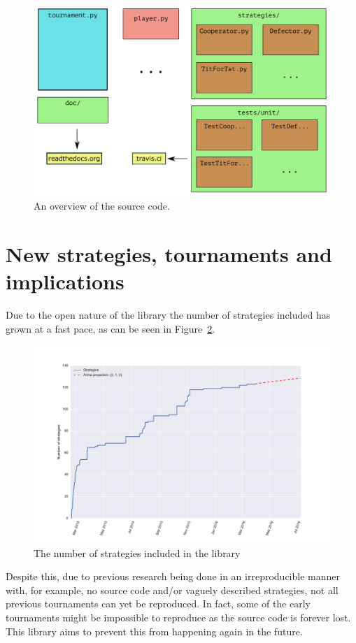 \documentclass{jors}
\begin{document}
\begin{figure}[!hbtp]
	\centering
	\includegraphics[width=.9\textwidth]{outline_of_library.pdf}
	\caption{An overview of the source code.}
	\label{fig:overview}
\end{figure}

\section*{New strategies, tournaments and implications}\label{sec:new-strategies-and-implications}

Due to the open nature of the library the number of strategies included has
grown at a fast pace, as can be seen in
Figure~\ref{fig:number_of_strategies_against_date}.

\begin{figure}[!hbtp]
	\centering
	\includegraphics[width=.75\textwidth]{number_of_strategies_with_arima_projection.pdf}
	\caption{The number of strategies included in the library}
	\label{fig:number_of_strategies_against_date}
\end{figure}

Despite this, due to previous research being done in an irreproducible manner
with, for example, no source code and/or vaguely described strategies, not all
previous tournaments can yet be reproduced. In fact, some of the early
tournaments might be impossible to reproduce as the source code is forever
lost. This library aims to prevent this from happening again in the future.
\end{document}
